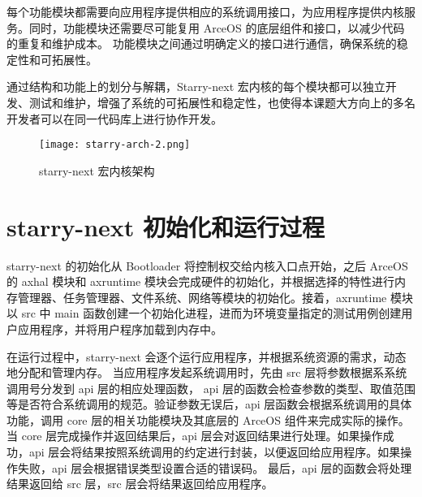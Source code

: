 每个功能模块都需要向应用程序提供相应的系统调用接口，为应用程序提供内核服务。同时，功能模块还需要尽可能复用 ArceOS 的底层组件和接口，以减少代码的重复和维护成本。
功能模块之间通过明确定义的接口进行通信，确保系统的稳定性和可拓展性。

通过结构和功能上的划分与解耦，Starry-next 宏内核的每个模块都可以独立开发、测试和维护，增强了系统的可拓展性和稳定性，也使得本课题大方向上的多名开发者可以在同一代码库上进行协作开发。

\begin{figure}[H]
    \centering
    \texttt{[image: starry-arch-2.png]}
    \caption{starry-next 宏内核架构}
    \label{fig:starry-next}
\end{figure}

\section{starry-next 初始化和运行过程}


starry-next 的初始化从 Bootloader 将控制权交给内核入口点开始，之后 ArceOS 的 axhal 模块和 axruntime 模块会完成硬件的初始化，并根据选择的特性进行内存管理器、任务管理器、文件系统、网络等模块的初始化。接着，axruntime 模块以 src 中 main 函数创建一个初始化进程，进而为环境变量指定的测试用例创建用户应用程序，并将用户程序加载到内存中。


在运行过程中，starry-next 会逐个运行应用程序，并根据系统资源的需求，动态地分配和管理内存。
当应用程序发起系统调用时，先由 src 层将参数根据系系统调用号分发到 api 层的相应处理函数，
api 层的函数会检查参数的类型、取值范围等是否符合系统调用的规范。验证参数无误后，api 层函数会根据系统调用的具体功能，调用 core 层的相关功能模块及其底层的 ArceOS 组件来完成实际的操作。
当 core 层完成操作并返回结果后，api 层会对返回结果进行处理。如果操作成功，api 层会将结果按照系统调用的约定进行封装，以便返回给应用程序。如果操作失败，api 层会根据错误类型设置合适的错误码。
最后，api 层的函数会将处理结果返回给 src 层，src 层会将结果返回给应用程序。

